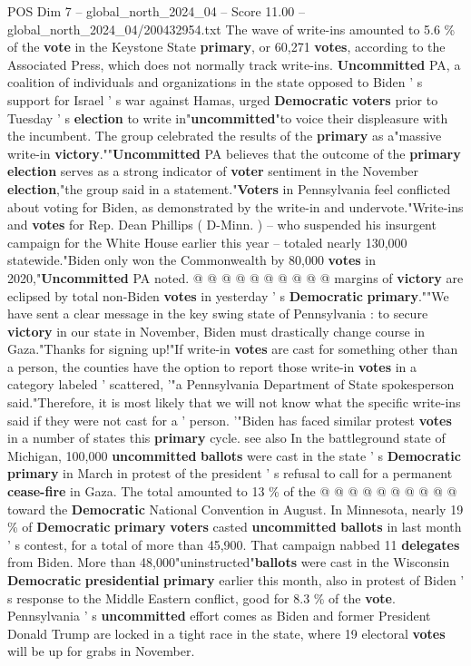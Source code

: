 \begin{textsample}{POS Dim 7 – global\_north\_2024\_04 – Score 11.00 – global\_north\_2024\_04/200432954.txt}  \label{ex:f7_pos_065}
The wave of write-ins amounted to 5.6 \% of the \textbf{vote} in the Keystone State \textbf{primary}, or 60,271 \textbf{votes}, according to the Associated Press, which does not normally track write-ins. \textbf{Uncommitted} PA, a coalition of individuals and organizations in the state opposed to Biden ' s support for Israel ' s war against Hamas, urged \textbf{Democratic} \textbf{voters} prior to Tuesday ' s \textbf{election} to write in"\textbf{uncommitted}"to voice their displeasure with the incumbent.
The group celebrated the results of the \textbf{primary} as a"massive write-in \textbf{victory}.""\textbf{Uncommitted} PA believes that the outcome of the \textbf{primary} \textbf{election} serves as a strong indicator of \textbf{voter} sentiment in the November \textbf{election},"the group said in a statement."\textbf{Voters} in Pennsylvania feel conflicted about voting for Biden, as demonstrated by the write-in and undervote."Write-ins and \textbf{votes} for Rep.
Dean Phillips ( D-Minn. ) -- who suspended his insurgent campaign for the White House earlier this year -- totaled nearly 130,000 statewide."Biden only won the Commonwealth by 80,000 \textbf{votes} in 2020,"\textbf{Uncommitted} PA noted. @ @ @ @ @ @ @ @ @ @ margins of \textbf{victory} are eclipsed by total non-Biden \textbf{votes} in yesterday ' s \textbf{Democratic} \textbf{primary}.""We have sent a clear message in the key swing state of Pennsylvania : to secure \textbf{victory} in our state in November, Biden must drastically change course in Gaza."Thanks for signing up!"If write-in \textbf{votes} are cast for something other than a person, the counties have the option to report those write-in \textbf{votes} in a category labeled ' scattered, '"a Pennsylvania Department of State spokesperson said."Therefore, it is most likely that we will not know what the specific write-ins said if they were not cast for a ' person. '"Biden has faced similar protest \textbf{votes} in a number of states this \textbf{primary} cycle. see also In the battleground state of Michigan, 100,000 \textbf{uncommitted} \textbf{ballots} were cast in the state ' s \textbf{Democratic} \textbf{primary} in March in protest of the president ' s refusal to call for a permanent \textbf{cease-fire} in Gaza.
The total amounted to 13 \% of the @ @ @ @ @ @ @ @ @ @ toward the \textbf{Democratic} National Convention in August.
In Minnesota, nearly 19 \% of \textbf{Democratic} \textbf{primary} \textbf{voters} casted \textbf{uncommitted} \textbf{ballots} in last month ' s contest, for a total of more than 45,900.
That campaign nabbed 11 \textbf{delegates} from Biden.
More than 48,000"uninstructed"\textbf{ballots} were cast in the Wisconsin \textbf{Democratic} \textbf{presidential} \textbf{primary} earlier this month, also in protest of Biden ' s response to the Middle Eastern conflict, good for 8.3 \% of the \textbf{vote}.
Pennsylvania ' s \textbf{uncommitted} effort comes as Biden and former President Donald Trump are locked in a tight race in the state, where 19 electoral \textbf{votes} will be up for grabs in November.


\end{textsample}
